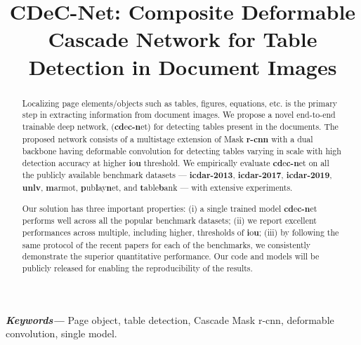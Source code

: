 \documentclass[a4paper,conference]{IEEEtran}
\providecommand{\keywords}[1]
{
 \small	
 \textbf{\textit{Keywords---}} #1
}
\begin{document}
\title{CDeC-Net: Composite Deformable Cascade Network for Table Detection in Document Images}

\author{
\and
{}
\and
{}
}
\maketitle

\begin{abstract}
Localizing page elements/objects such as tables, figures, equations, etc. is the primary step in extracting information from document images. We propose a novel end-to-end trainable deep network, ({\sc \textbf{cd}}e{\sc \textbf{c-n}}et) for detecting tables present in the documents. The proposed network consists of a multistage extension of Mask {\sc \textbf{r-cnn}} with a dual backbone having deformable convolution for detecting tables varying in scale with high detection accuracy at higher {\sc \textbf{i}}o{\sc \textbf{u}} threshold. We empirically evaluate {\sc \textbf{cd}}e{\sc \textbf{c-n}}et on all the publicly available benchmark datasets --- {\sc \textbf{icdar-2013}}, {\sc \textbf{icdar-2017}}, {\sc \textbf{icdar-2019}}, {\sc \textbf{unlv}}, {\sc \textbf{m}}armot, {\sc \textbf{p}}ub{\sc \textbf{l}}ay{\sc \textbf{n}}et, and {\sc \textbf{t}}able{\sc \textbf{b}}ank --- with extensive experiments.

Our solution has three important properties: (i) a single trained model {\sc \textbf{cd}}e{\sc \textbf{c-n}}et performs well across all the popular benchmark datasets; (ii) we report excellent performances across multiple, including higher, thresholds of {\sc \textbf{i}}o{\sc \textbf{u}}; (iii) by following the same protocol of the recent papers for each of the benchmarks, we consistently demonstrate the superior quantitative performance. Our code and models will be publicly released for enabling the reproducibility of the results.

\end{abstract}

\keywords{Page object, table detection, Cascade Mask {\sc r-cnn}, deformable convolution, single model.}
\end{document}
